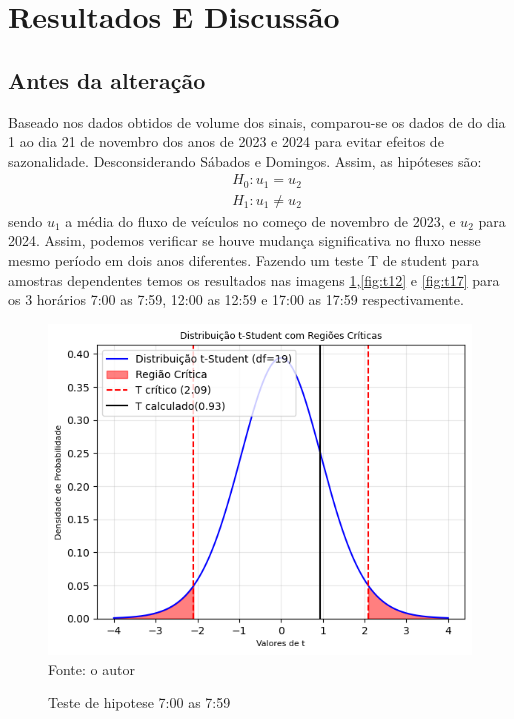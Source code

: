 \section{Resultados E Discussão}
\subsection{Antes da alteração}
Baseado nos dados obtidos de volume dos sinais, comparou-se os dados de do dia 1 ao dia 21 de novembro dos anos de 2023 e 2024 para evitar efeitos de sazonalidade. Desconsiderando Sábados e Domingos. Assim, as hipóteses são:
\begin{equation*}
    \begin{aligned}
 \quad H_0 : u_1=u_2\\
 \quad H_1 : u_1\neq u_2
    \end{aligned}
\end{equation*}
sendo \(u_1\) a média do fluxo de veículos no começo de novembro de 2023, e \(u_2\) para 2024. Assim, podemos verificar se houve mudança significativa no fluxo nesse mesmo período em dois anos diferentes. Fazendo um teste T de student para amostras dependentes temos os resultados nas imagens \ref{fig:t7},\ref{fig:t12} e \ref{fig:t17} para os 3 horários 7:00 as 7:59, 12:00 as 12:59 e 17:00 as 17:59 respectivamente.
\begin{figure}[H]
    \centering
    \caption{Teste de hipotese 7:00 as 7:59}
    \includegraphics[width=1\linewidth]{Imagens/7.png}
    {\footnotesize\\ Fonte: o autor}
    \label{fig:t7}
\end{figure}
